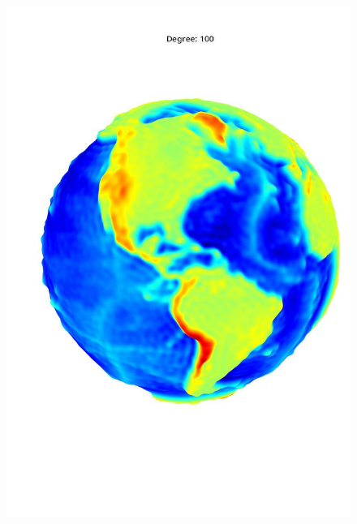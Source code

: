 \documentclass[a4paper]{article}
\theoremstyle{definition}
\begin{document}
\begin{figure}[h!]
\begin{minipage}{.245\textwidth}
        \includegraphics[width=0.95\linewidth]{media/med_100.jpg}
        \label{fig:med100}
    \end{minipage}
    \begin{minipage}{.245\textwidth}
        \centering

\end{minipage}
\end{figure}
\end{document}

